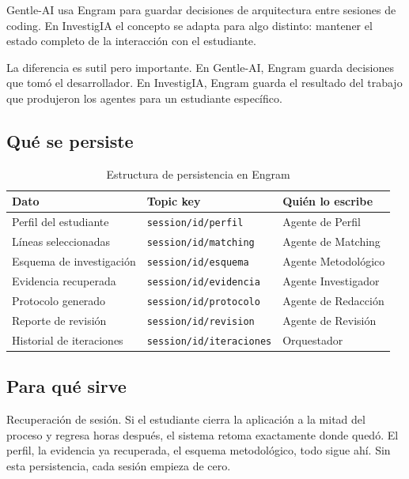 \documentclass[12pt, a4paper]{article}
\begin{document}
Gentle-AI usa Engram para guardar decisiones de arquitectura entre sesiones
de coding. En InvestigIA el concepto se adapta para algo distinto: mantener
el estado completo de la interacción con el estudiante.

La diferencia es sutil pero importante. En Gentle-AI, Engram guarda
decisiones que tomó el desarrollador. En InvestigIA, Engram guarda el
resultado del trabajo que produjeron los agentes para un estudiante
específico.

\newpage
\subsection{Qué se persiste}

\begin{table}[h!]
\centering
\begin{tabular}{@{}p{3.5cm}p{4cm}p{5.5cm}@{}}
\toprule
\textbf{Dato} & \textbf{Topic key} & \textbf{Quién lo escribe} \\
\midrule
Perfil del estudiante & \texttt{session/{id}/perfil} & Agente de Perfil \\
\addlinespace
Líneas seleccionadas & \texttt{session/{id}/matching} & Agente de Matching \\
\addlinespace
Esquema de investigación & \texttt{session/{id}/esquema} & Agente Metodológico \\
\addlinespace
Evidencia recuperada & \texttt{session/{id}/evidencia} & Agente Investigador \\
\addlinespace
Protocolo generado & \texttt{session/{id}/protocolo} & Agente de Redacción \\
\addlinespace
Reporte de revisión & \texttt{session/{id}/revision} & Agente de Revisión \\
\addlinespace
Historial de iteraciones & \texttt{session/{id}/iteraciones} & Orquestador \\
\bottomrule
\end{tabular}
\caption{Estructura de persistencia en Engram}
\end{table}

\subsection{Para qué sirve}

Recuperación de sesión. Si el estudiante cierra la aplicación a la mitad
del proceso y regresa horas después, el sistema retoma exactamente donde
quedó. El perfil, la evidencia ya recuperada, el esquema metodológico,
todo sigue ahí. Sin esta persistencia, cada sesión empieza de cero.
\end{document}
